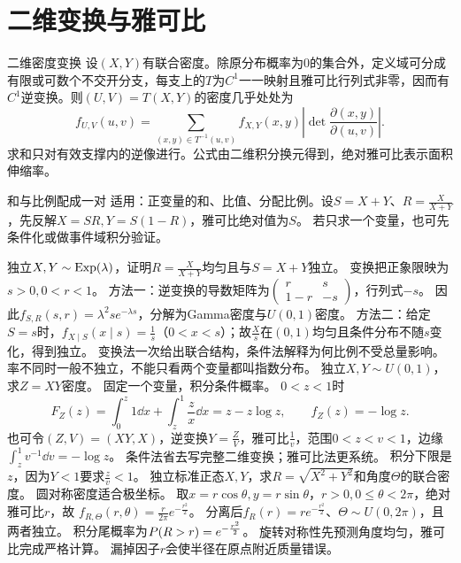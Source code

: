 \section{二维变换与雅可比}\label{sec:33}
\begin{theorem}{二维密度变换}
设$(X,Y)$有联合密度。除原分布概率为0的集合外，定义域可分成有限或可数个不交开分支，每支上的$T$为$C^1$一一映射且雅可比行列式非零，因而有$C^1$逆变换。则$(U,V)=T(X,Y)$的密度几乎处处为
\[f_{U,V}(u,v)=\sum_{(x,y)\in T^{-1}(u,v)}f_{X,Y}(x,y)\left|\det\dfrac{\partial(x,y)}{\partial(u,v)}\right|.\]
求和只对有效支撑内的逆像进行。公式由二维积分换元得到，绝对雅可比表示面积伸缩率。
\end{theorem}
\begin{method}{和与比例配成一对}
适用：正变量的和、比值、分配比例。设$S=X+Y$、$R=\frac{X}{X+Y}$，先反解$X=SR,Y=S(1-R)$，雅可比绝对值为$S$。
若只求一个变量，也可先条件化或做事件域积分验证。
\end{method}
{独立$X,Y\sim\operatorname{Exp}(\lambda)$，证明$R=\frac{X}{X+Y}$均匀且与$S=X+Y$独立。}
{变换把正象限映为$s>0,0<r<1$。}
{方法一：逆变换的导数矩阵为$\begin{pmatrix}r&s\\1-r&-s\end{pmatrix}$，行列式$-s$。
因此$f_{S,R}(s,r)=\lambda^2se^{-\lambda s}$，分解为Gamma密度与$U(0,1)$密度。
方法二：给定$S=s$时，$f_{X\mid S}(x\mid s)=\frac{1}{s}$（$0<x<s$）；故$\frac{X}{s}$在$(0,1)$均匀且条件分布不随$s$变化，得到独立。}
{变换法一次给出联合结构，条件法解释为何比例不受总量影响。}
{率不同时一般不独立，不能只看两个变量都叫指数分布。}
{独立$X,Y\sim U(0,1)$，求$Z=XY$密度。}
{固定一个变量，积分条件概率。}
{$0<z<1$时
\[F_Z(z)=\int_0^z1\dd x+\int_z^1\dfrac z x\dd x=z-z\log z,\qquad f_Z(z)=-\log z.\]
也可令$(Z,V)=(XY,X)$，逆变换$Y=\frac{Z}{V}$，雅可比$\frac{1}{v}$，范围$0<z<v<1$，边缘$\int_z^1v^{-1}\dd v=-\log z$。}
{条件法省去写完整二维变换；雅可比法更系统。}
{积分下限是$z$，因为$Y<1$要求$\frac{z}{v}<1$。}
{独立标准正态$X,Y$，求$R=\sqrt{X^2+Y^2}$和角度$\Theta$的联合密度。}
{圆对称密度适合极坐标。}
{取$x=r\cos\theta,y=r\sin\theta$，$r>0,0\le\theta<2\pi$，绝对雅可比$r$，故
$f_{R,\Theta}(r,\theta)=\frac{r}{2\pi}e^{-\frac{r^2}{2}}$。
分离后$f_R(r)=re^{-\frac{r^2}{2}}$、$\Theta\sim U(0,2\pi)$，且两者独立。
积分尾概率为$P(R>r)=e^{-\frac{r^2}{2}}$。}
{旋转对称性先预测角度均匀，雅可比完成严格计算。}
{漏掉因子$r$会使半径在原点附近质量错误。}

